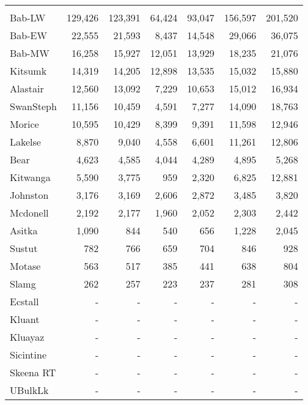 \documentclass[french,11pt]{book}
\begin{document}
\begin{longtable}[t]{lrrrrrr}
\midrule\\ Bab-LW & 129,426 & 123,391 & 64,424 & 93,047 & 156,597 & 201,520\\ Bab-EW & 22,555 & 21,593 & 8,437 & 14,548 & 29,066 & 36,075\\ Bab-MW & 16,258 & 15,927 & 12,051 & 13,929 & 18,235 & 21,076\\ Kitsumk & 14,319 & 14,205 & 12,898 & 13,535 & 15,032 & 15,880\\ Alastair & 12,560 & 13,092 & 7,229 & 10,653 & 15,012 & 16,934\\ SwanSteph & 11,156 & 10,459 & 4,591 & 7,277 & 14,090 & 18,763\\ Morice & 10,595 & 10,429 & 8,399 & 9,391 & 11,598 & 12,946\\ Lakelse & 8,870 & 9,040 & 4,558 & 6,601 & 11,261 & 12,806\\ Bear & 4,623 & 4,585 & 4,044 & 4,289 & 4,895 & 5,268\\ Kitwanga & 5,590 & 3,775 & 959 & 2,320 & 6,825 & 12,881\\ Johnston & 3,176 & 3,169 & 2,606 & 2,872 & 3,485 & 3,820\\ Mcdonell & 2,192 & 2,177 & 1,960 & 2,052 & 2,303 & 2,442\\ Asitka & 1,090 & 844 & 540 & 656 & 1,228 & 2,045\\ Sustut & 782 & 766 & 659 & 704 & 846 & 928\\ Motase & 563 & 517 & 385 & 441 & 638 & 804\\ Slamg & 262 & 257 & 223 & 237 & 281 & 308\\ Ecstall & - & - & - & - & - & -\\ Kluant & - & - & - & - & - & -\\ Kluayaz & - & - & - & - & - & -\\ Sicintine & - & - & - & - & - & -\\ Skeena RT & - & - & - & - & - & -\\ UBulkLk & - & - & - & - & - & -\\* \end{longtable}

\endgroup{} \endgroup{}

\clearpage
\end{document}
